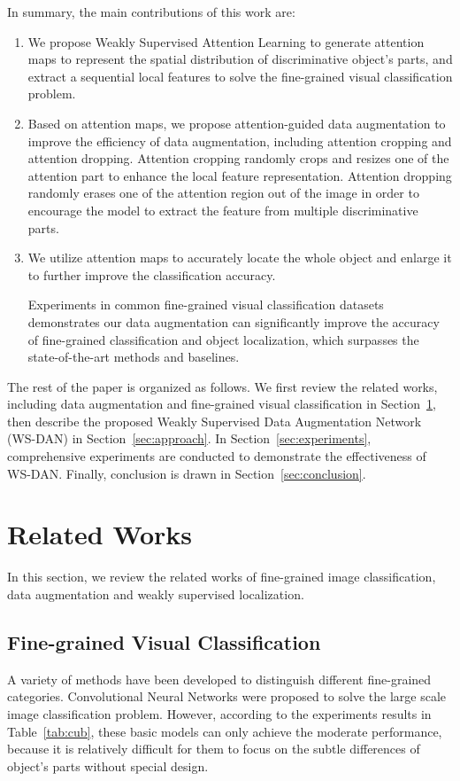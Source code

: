 \documentclass[10pt,twocolumn,letterpaper]{article}
\begin{document}
In summary, the main contributions of this work are:
\begin{enumerate}
    \item We propose Weakly Supervised Attention Learning to generate attention maps to represent the spatial distribution of discriminative object's parts, and extract a sequential local features to solve the fine-grained visual classification problem.
    \item Based on attention maps, we propose attention-guided data augmentation to improve the efficiency of data augmentation, including attention cropping and attention dropping. Attention cropping randomly crops and resizes one of the attention part to enhance the local feature representation. Attention dropping randomly erases one of the attention region out of the image in order to encourage the model to extract the feature from multiple discriminative parts.
    \item We utilize attention maps to accurately locate the whole object and enlarge it to further improve the classification accuracy.

    Experiments in common fine-grained visual classification datasets demonstrates our data augmentation can significantly improve the accuracy of fine-grained classification and object localization, which surpasses the state-of-the-art methods and baselines.
\end{enumerate}

The rest of the paper is organized as follows. We first review the related works, including data augmentation and fine-grained visual classification in Section~\ref{sec:related_work}, then describe the proposed Weakly Supervised Data Augmentation Network (WS-DAN) in Section~\ref{sec:approach}. In Section~\ref{sec:experiments}, comprehensive experiments are conducted to demonstrate the effectiveness of WS-DAN. Finally, conclusion is drawn in Section~\ref{sec:conclusion}.



\section{Related Works}
\label{sec:related_work}
In this section, we review the related works of fine-grained image classification, data augmentation and weakly supervised localization.

\subsection{Fine-grained Visual Classification}
A variety of methods have been developed to distinguish different fine-grained categories. Convolutional Neural Networks were proposed to solve the large scale image classification problem. However, according to the experiments results in Table~\ref{tab:cub}, these basic models can only achieve the moderate performance, because it is relatively difficult for them to focus on the subtle differences of object's parts without special design.
\end{document}
